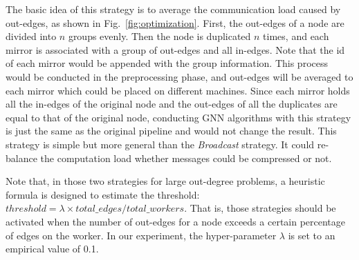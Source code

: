 \documentclass[conference]{IEEEtran}
\begin{document}
The basic idea of this strategy is to average the communication load caused by out-edges, as shown in Fig.~\ref{fig:optimization}.
First, the out-edges of a node are divided into $n$ groups evenly.
Then the node is duplicated $n$ times, and each mirror is associated with a group of out-edges and all in-edges. 
Note that the id of each mirror would be appended with the group information.
This process would be conducted in the preprocessing phase, and out-edges will be averaged to each mirror which could be placed on different machines.
Since each mirror holds all the in-edges of the original node and the out-edges of all the duplicates are equal to that of the original node, conducting GNN algorithms with this strategy is just the same as the original pipeline and would not change the result.
This strategy is simple but more general than the \emph{Broadcast} strategy.
It could re-balance the computation load whether messages could be compressed or not. 

Note that, in those two strategies for large out-degree problems, a heuristic formula is designed to estimate the threshold: $threshold = \lambda \times total\_edges/total\_workers$.
That is, those strategies should be activated when the number of out-edges for a node exceeds a certain percentage of edges on the worker.
In our experiment, the hyper-parameter $\lambda$ is set to an empirical value of 0.1.

\end{document}
